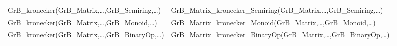 \begin{landscape}
\begin{table}[htb]
{\begin{tabular}{l|l}
{\sf GrB\_kronecker(GrB\_Matrix,\ldots,GrB\_Semiring,\ldots)} 				& {\sf GrB\_Matrix\_kronecker\_Semiring(GrB\_Matrix,\ldots,GrB\_Semiring,\ldots)} \\
{\sf GrB\_kronecker(GrB\_Matrix,\ldots,GrB\_Monoid,\ldots)} 				& {\sf GrB\_Matrix\_kronecker\_Monoid(GrB\_Matrix,\ldots,GrB\_Monoid,\ldots)} \\
{\sf GrB\_kronecker(GrB\_Matrix,\ldots,GrB\_BinaryOp,\ldots)} 				& {\sf GrB\_Matrix\_kronecker\_BinaryOp(GrB\_Matrix,\ldots,GrB\_BinaryOp,\ldots)} \\ 
\hline
\end{tabular}
}
\label{Tab:NonPolymorphic6}
\end{table}
\end{landscape}


